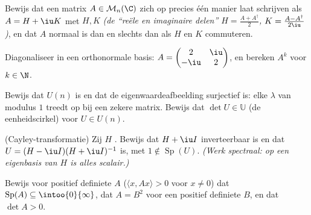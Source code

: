 \begin{exercise}[$\star$]\label{exo:b2:hermitian:3}
Bewijs dat een matrix $A \in \mathcal{M}_n(\C)$ zich op precies één
manier laat schrijven als $A = H + \iu K$ met $H, K$ 
\emph{(de ``reële en imaginaire delen'' $H = \frac{A +
A^\dagger}{2}$, $K = \frac{A - A^\dagger}{2\iu}$)}, en dat $A$
normaal is dan en slechts dan als $H$ en $K$ commuteren.
\end{exercise}

\begin{exercise}[$\star\star$]\label{exo:b2:hermitian:4}
Diagonaliseer in een orthonormale basis: $A = \begin{pmatrix} 2 &
\iu\\ -\iu & 2\end{pmatrix}$, en bereken $A^k$ voor $k \in \N$.
\end{exercise}

\begin{exercise}[$\star\star$]\label{exo:b2:hermitian:5}
Bewijs dat $U(n)$  is en dat de eigenwaardeafbeelding
surjectief is: elke $\lambda$ van modulus $1$ treedt op bij een
zekere  matrix. Bewijs dat $\det U \in \mathbb{U}$ (de
eenheidscirkel) voor $U \in U(n)$.
\end{exercise}

\begin{exercise}[$\star\star$]\label{exo:b2:hermitian:6}
(Cayley-transformatie) Zij $H$ . Bewijs dat $H + \iu I$
inverteerbaar is en dat $U = (H - \iu I)(H + \iu I)^{-1}$ 
is, met $1 \notin \operatorname{Sp}(U)$. \emph{(Werk spectraal: op
een eigenbasis van $H$ is alles scalair.)}
\end{exercise}

\begin{exercise}[$\star\star$]\label{exo:b2:hermitian:7}
Bewijs voor  positief definiete $A$ ($\langle x,
Ax\rangle > 0$ voor $x \neq 0$) dat $\operatorname{Sp}(A)
\subseteq \intoo{0}{\infty}$, dat $A = B^2$ voor een 
positief definiete $B$, en dat $\det A > 0$.
\end{exercise}

